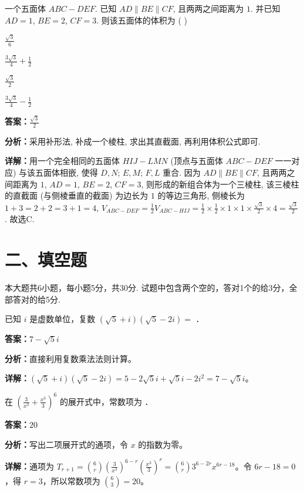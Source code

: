 \begin{question}[points=5]
一个五面体 $ABC-DEF$. 已知 $AD \parallel BE \parallel CF$, 且两两之间距离为 $1$. 并已知 $AD=1$, $BE=2$, $CF=3$. 则该五面体的体积为 ( )
\begin{choices}
  \item $\frac{\sqrt{3}}{6}$
  \item $\frac{3\sqrt{3}}{4}+\frac{1}{2}$
  \item $\frac{\sqrt{3}}{2}$
  \item $\frac{3\sqrt{3}}{4}-\frac{1}{2}$
\end{choices}
\begin{solution}
\textbf{答案：}$\frac{\sqrt{3}}{2}$

\textbf{分析：}采用补形法, 补成一个棱柱, 求出其直截面, 再利用体积公式即可.

\textbf{详解：}用一个完全相同的五面体 $HIJ-LMN$ (顶点与五面体 $ABC-DEF$ 一一对应) 与该五面体相嵌, 使得 $D,N$; $E,M$; $F,L$ 重合. 因为 $AD \parallel BE \parallel CF$, 且两两之间距离为 $1$, $AD=1$, $BE=2$, $CF=3$, 则形成的新组合体为一个三棱柱, 该三棱柱的直截面 (与侧棱垂直的截面) 为边长为 $1$ 的等边三角形, 侧棱长为 $1+3=2+2=3+1=4$, $V_{ABC-DEF}=\frac{1}{2}V_{ABC-HIJ}=\frac{1}{2}\times\frac{1}{2}\times 1\times 1\times \frac{\sqrt{3}}{2}\times 4=\frac{\sqrt{3}}{2}$. 故选C.
\end{solution}
\end{question}

\section*{二、填空题}
本大题共6小题，每小题5分，共30分. 试题中包含两个空的，答对1个的给3分，全部答对的给5分.

\begin{question}[points=5]
已知 $i$ 是虚数单位，复数 $(\sqrt{5}+i)(\sqrt{5}-2i)=$ ．
\fillin[{$7-\sqrt{5}i$}]
\begin{solution}
\textbf{答案：}$7-\sqrt{5}i$

\textbf{分析：}直接利用复数乘法法则计算。

\textbf{详解：}$(\sqrt{5}+i)(\sqrt{5}-2i)=5-2\sqrt{5}i+\sqrt{5}i-2i^2=7-\sqrt{5}i$。
\end{solution}
\end{question}

\begin{question}[points=5]
在 $\left(\frac{3}{x^3}+\frac{x^3}{3}\right)^6$ 的展开式中，常数项为 ．
\fillin[{$20$}]
\begin{solution}
\textbf{答案：}$20$

\textbf{分析：}写出二项展开式的通项，令 $x$ 的指数为零。

\textbf{详解：}通项为 $T_{r+1}=\binom{6}{r}\left(\frac{3}{x^3}\right)^{6-r}\left(\frac{x^3}{3}\right)^r=\binom{6}{r}3^{6-2r}x^{6r-18}$。令 $6r-18=0$，得 $r=3$，所以常数项为 $\binom{6}{3}=20$。
\end{solution}
\end{question}

